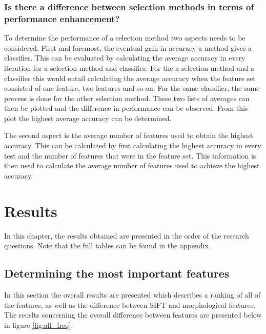 \documentclass{kththesis}
\begin{document}
\subsection{Is there a difference between selection methods in terms of performance enhancement?}

To determine the performance of a selection method two aspects needs to be considered. First and foremost, the eventual gain in accuracy a method gives a classifier. This can be evaluated by calculating the average accuracy in every iteration for a selection method and classifier. For the a selection method and a classifier this would entail calculating the average accuracy when the feature set consisted of one feature, two features and so on. For the same classifier, the same process is done for the other selection method. These two lists of averages can then be plotted and the difference in performance can be observed. From this plot the highest average accuracy can be determined. 


The second aspect is the average number of features used to obtain the highest accuracy. This can be calculated by first calculating the highest accuracy in every test and the number of features that were in the feature set. This information is then used to calculate the average number of features used to achieve the highest accuracy. 


\chapter{Results}

In this chapter, the results obtained are presented in the order of the research questions. Note that the full tables can be found in the appendix.


\section{Determining the most important features}

In this section the overall results are presented which describes a ranking of all of the features, as well as the difference between SIFT and morphological features. The reuslts concerning the overall difference between features are presented below in figure \ref{fig:all_freq}.

\end{document}
